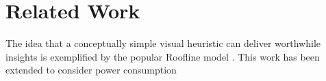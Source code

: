 \section{Related Work}
The idea that a conceptually simple visual heuristic can deliver worthwhile insights is exemplified by the popular Roofline model \cite{williams:2009aa}. This work has been extended to consider power consumption \cite{choi:2013aa}  
